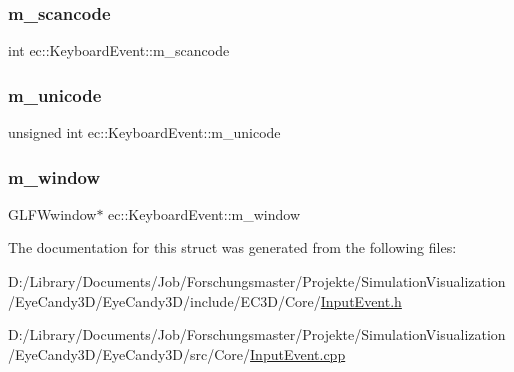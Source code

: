\mbox{\label{structec_1_1_keyboard_event_a99de30a0a1504392405bbcfee3debd57}} 
\subsubsection{\texorpdfstring{m\+\_\+scancode}{m\_scancode}}
{\footnotesize\ttfamily int ec\+::\+Keyboard\+Event\+::m\+\_\+scancode}

\mbox{\label{structec_1_1_keyboard_event_a530cc03b6d62e8068694756426222909}} 
\subsubsection{\texorpdfstring{m\+\_\+unicode}{m\_unicode}}
{\footnotesize\ttfamily unsigned int ec\+::\+Keyboard\+Event\+::m\+\_\+unicode}

\mbox{\label{structec_1_1_keyboard_event_a6de06c21e83612aeca727beedd93ae82}} 
\subsubsection{\texorpdfstring{m\+\_\+window}{m\_window}}
{\footnotesize\ttfamily G\+L\+F\+Wwindow$\ast$ ec\+::\+Keyboard\+Event\+::m\+\_\+window}



The documentation for this struct was generated from the following files\+:\begin{DoxyCompactItemize}
\item 
D\+:/\+Library/\+Documents/\+Job/\+Forschungsmaster/\+Projekte/\+Simulation\+Visualization/\+Eye\+Candy3\+D/\+Eye\+Candy3\+D/include/\+E\+C3\+D/\+Core/\mbox{\hyperlink{_input_event_8h}{Input\+Event.\+h}}\item 
D\+:/\+Library/\+Documents/\+Job/\+Forschungsmaster/\+Projekte/\+Simulation\+Visualization/\+Eye\+Candy3\+D/\+Eye\+Candy3\+D/src/\+Core/\mbox{\hyperlink{_input_event_8cpp}{Input\+Event.\+cpp}}\end{DoxyCompactItemize}
